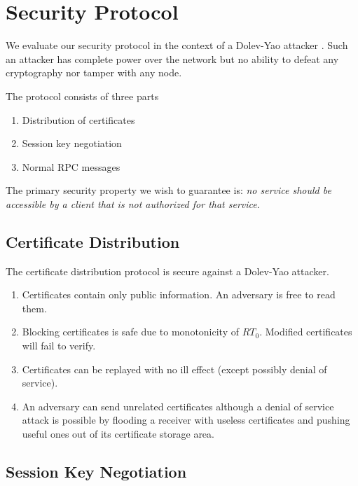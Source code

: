 \section{Security Protocol}
\label{section-protocol}

We evaluate our security protocol in the context of a Dolev-Yao attacker \cite{something}. Such
an attacker has complete power over the network but no ability to defeat any cryptography nor
tamper with any node. 

The protocol consists of three parts
\begin{enumerate}
\item Distribution of certificates
\item Session key negotiation
\item Normal RPC messages
\end{enumerate}

The primary security property we wish to guarantee is: \textit{no service should be accessible
  by a client that is not authorized for that service}.

\subsection{Certificate Distribution}

The certificate distribution protocol is secure against a Dolev-Yao attacker.
\begin{enumerate}
\item Certificates contain only public information. An adversary is free to read them.
\item Blocking certificates is safe due to monotonicity of $RT_0$. Modified certificates will
  fail to verify.
\item Certificates can be replayed with no ill effect (except possibly denial of service).
\item An adversary can send unrelated certificates although a denial of service attack is
  possible by flooding a receiver with useless certificates and pushing useful ones out of its
  certificate storage area.
\end{enumerate}

\subsection{Session Key Negotiation}
\label{section-session-key-negotiation}

